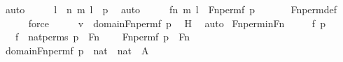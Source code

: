 \begin{isabellebody}
\ auto\isanewline
\ \ \isamarkupfalse%
\ \isamarkupfalse%
\ l\ \ {\isachardoublequoteopen}{\isacharless}{\kern0pt}{\isacharless}{\kern0pt}n{\isacharcomma}{\kern0pt}\ m{\isachargreater}{\kern0pt}{\isacharcomma}{\kern0pt}\ l{\isachargreater}{\kern0pt}\ {\isasymin}\ p{\isachardoublequoteclose}\ \isamarkupfalse%
\ auto\isanewline
\ \ \isamarkupfalse%
\ \isamarkupfalse%
\ {\isachardoublequoteopen}{\isacharless}{\kern0pt}{\isacharless}{\kern0pt}f{\isacharbackquote}{\kern0pt}n{\isacharcomma}{\kern0pt}\ m{\isachargreater}{\kern0pt}{\isacharcomma}{\kern0pt}\ l{\isachargreater}{\kern0pt}\ {\isasymin}\ Fn{\isacharunderscore}{\kern0pt}perm{\isacharparenleft}{\kern0pt}f{\isacharcomma}{\kern0pt}\ p{\isacharparenright}{\kern0pt}{\isachardoublequoteclose}\ \isanewline
\ \ \ \ \isamarkupfalse%
\ Fn{\isacharunderscore}{\kern0pt}perm{\isacharunderscore}{\kern0pt}def\isanewline
\ \ \ \ \isamarkupfalse%
\ force\isanewline
\ \ \isamarkupfalse%
\ \isamarkupfalse%
\ {\isachardoublequoteopen}v\ {\isasymin}\ domain{\isacharparenleft}{\kern0pt}Fn{\isacharunderscore}{\kern0pt}perm{\isacharparenleft}{\kern0pt}f{\isacharcomma}{\kern0pt}\ p{\isacharparenright}{\kern0pt}{\isacharparenright}{\kern0pt}{\isachardoublequoteclose}\ \isamarkupfalse%
\ H\ \isamarkupfalse%
\ auto\isanewline
{}\isamarkupfalse%
%
\endisatagproof
{\isafoldproof}%
%
\isadelimproof
\isanewline
%
\endisadelimproof
\isanewline
{}\isamarkupfalse%
\ Fn{\isacharunderscore}{\kern0pt}perm{\isacharunderscore}{\kern0pt}in{\isacharunderscore}{\kern0pt}Fn\ {\isacharcolon}{\kern0pt}\ \isanewline
\ \ \ f\ p\ \isanewline
\ \ \ {\isachardoublequoteopen}f\ {\isasymin}\ nat{\isacharunderscore}{\kern0pt}perms{\isachardoublequoteclose}\ {\isachardoublequoteopen}p\ {\isasymin}\ Fn{\isachardoublequoteclose}\ \isanewline
\ \ \ {\isachardoublequoteopen}Fn{\isacharunderscore}{\kern0pt}perm{\isacharparenleft}{\kern0pt}f{\isacharcomma}{\kern0pt}\ p{\isacharparenright}{\kern0pt}\ {\isasymin}\ Fn{\isachardoublequoteclose}\ \isanewline
%
\isadelimproof
%
\endisadelimproof
%
\isatagproof
{}\isamarkupfalse%
\ {\isacharminus}{\kern0pt}\ \isanewline
\isanewline
\ \ \isamarkupfalse%
\ {\isachardoublequoteopen}domain{\isacharparenleft}{\kern0pt}Fn{\isacharunderscore}{\kern0pt}perm{\isacharparenleft}{\kern0pt}f{\isacharcomma}{\kern0pt}\ p{\isacharparenright}{\kern0pt}{\isacharparenright}{\kern0pt}\ {\isasymsubseteq}\ nat\ {\isasymtimes}\ nat{\isachardoublequoteclose}\ {\isacharparenleft}{\kern0pt}\ {\isacharquery}{\kern0pt}A{\isacharparenright}{\kern0pt}\isanewline

\end{isabellebody}
